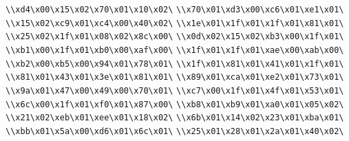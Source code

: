\verb|\\xd4\x00\x15\x02\x70\x01\x10\x02\|\newline
\verb|\\x70\x01\xd3\x00\xc6\x01\xe1\x01\|\newline
\verb|\\x15\x02\xc9\x01\xc4\x00\x40\x02\|\newline
\verb|\\x1e\x01\x1f\x01\x1f\x01\x81\x01\|\newline
\verb|\\x25\x02\x1f\x01\x08\x02\x8c\x00\|\newline
\verb|\\x0d\x02\x15\x02\xb3\x00\x1f\x01\|\newline
\verb|\\xb1\x00\x1f\x01\xb0\x00\xaf\x00\|\newline
\verb|\\x1f\x01\x1f\x01\xae\x00\xab\x00\|\newline
\verb|\\xb2\x00\xb5\x00\x94\x01\x78\x01\|\newline
\verb|\\x1f\x01\x81\x01\x41\x01\x1f\x01\|\newline
\verb|\\x81\x01\x43\x01\x3e\x01\x81\x01\|\newline
\verb|\\x89\x01\xca\x01\xe2\x01\x73\x01\|\newline
\verb|\\x9a\x01\x47\x00\x49\x00\x70\x01\|\newline
\verb|\\xc7\x00\x1f\x01\x4f\x01\x53\x01\|\newline
\verb|\\x6c\x00\x1f\x01\xf0\x01\x87\x00\|\newline
\verb|\\xb8\x01\xb9\x01\xa0\x01\x05\x02\|\newline
\verb|\\x21\x02\xeb\x01\xee\x01\x18\x02\|\newline
\verb|\\x6b\x01\x14\x02\x23\x01\xba\x01\|\newline
\verb|\\xbb\x01\x5a\x00\xd6\x01\x6c\x01\|\newline
\verb|\\x25\x01\x28\x01\x2a\x01\x40\x02\|\newline
